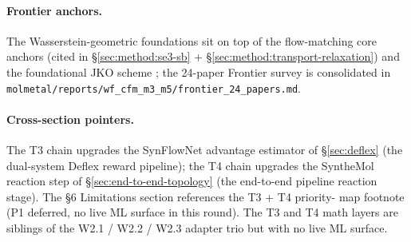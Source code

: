 \paragraph{Frontier anchors.}
The Wasserstein-geometric foundations sit on top of the
flow-matching core anchors (cited in
\S\ref{sec:method:se3-sb} + \S\ref{sec:method:transport-relaxation})
and the foundational JKO scheme
\cite{jordan1998jko,otto2001wf}; the 24-paper Frontier survey is
consolidated in
\texttt{molmetal/reports/wf\_cfm\_m3\_m5/frontier\_24\_papers.md}.

\paragraph{Cross-section pointers.}
The T3 chain upgrades the SynFlowNet advantage estimator of
\S\ref{sec:deflex} (the dual-system Deflex reward pipeline); the T4
chain upgrades the SyntheMol reaction step of
\S\ref{sec:end-to-end-topology} (the end-to-end pipeline reaction
stage).  The §6 Limitations section references the T3 + T4 priority-
map footnote (P1 deferred, no live ML surface in this round).  The
T3 and T4 math layers are siblings of the W2.1 / W2.2 / W2.3
adapter trio but with no live ML surface.

\makeatletter
\let\cite\WForigCiteWGF
\makeatother
